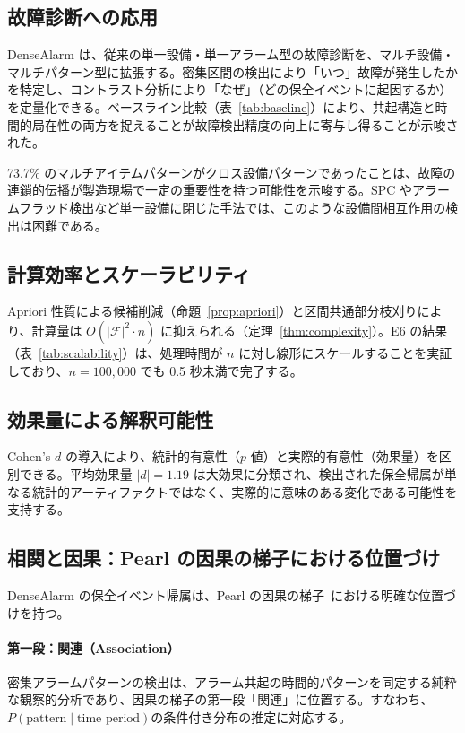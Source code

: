 \documentclass[11pt]{article}
\begin{document}
\subsection{故障診断への応用}

DenseAlarm は、従来の単一設備・単一アラーム型の故障診断を、マルチ設備・マルチパターン型に拡張する。密集区間の検出により「いつ」故障が発生したかを特定し、コントラスト分析により「なぜ」（どの保全イベントに起因するか）を定量化できる。ベースライン比較（表~\ref{tab:baseline}）により、共起構造と時間的局在性の両方を捉えることが故障検出精度の向上に寄与し得ることが示唆された。

73.7\% のマルチアイテムパターンがクロス設備パターンであったことは、故障の連鎖的伝播が製造現場で一定の重要性を持つ可能性を示唆する。SPC やアラームフラッド検出など単一設備に閉じた手法では、このような設備間相互作用の検出は困難である。

\subsection{計算効率とスケーラビリティ}

Apriori 性質による候補削減（命題~\ref{prop:apriori}）と区間共通部分枝刈りにより、計算量は $O(|\mathcal{F}|^2 \cdot n)$ に抑えられる（定理~\ref{thm:complexity}）。E6 の結果（表~\ref{tab:scalability}）は、処理時間が $n$ に対し線形にスケールすることを実証しており、$n=100{,}000$ でも 0.5 秒未満で完了する。

\subsection{効果量による解釈可能性}

Cohen's $d$ の導入により、統計的有意性（$p$ 値）と実際的有意性（効果量）を区別できる。平均効果量 $|d|=1.19$ は大効果に分類され、検出された保全帰属が単なる統計的アーティファクトではなく、実際的に意味のある変化である可能性を支持する。

\subsection{相関と因果：Pearl の因果の梯子における位置づけ}\label{sec:causal-positioning}

DenseAlarm の保全イベント帰属は、Pearl の因果の梯子~\citep{pearl2009causality}における明確な位置づけを持つ。

\paragraph{第一段：関連（Association）}
密集アラームパターンの検出は、アラーム共起の時間的パターンを同定する純粋な観察的分析であり、因果の梯子の第一段「関連」に位置する。すなわち、$P(\text{pattern} \mid \text{time period})$の条件付き分布の推定に対応する。
\end{document}
